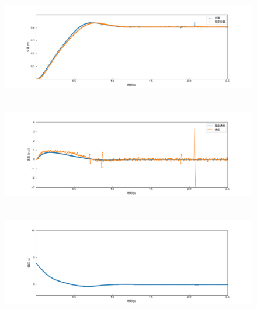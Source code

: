 \documentclass[12pt]{jsarticle}
\begin{document}
\begin{figure}[H]
  \begin{center}
    \includegraphics[clip,width=13.0cm, height=4.4cm]{../img/Exp11-1.png}
    \caption{}
    \label{Exp11-1}
  \end{center}
\end{figure}
\begin{figure}[H]
  \begin{center}
    \includegraphics[clip,width=13.0cm, height=4.4cm]{../img/Exp11-2.png}
    \caption{}
    \label{Exp11-2}
  \end{center}
\end{figure}
\begin{figure}[H]
  \begin{center}
    \includegraphics[clip,width=13.0cm, height=4.4cm]{../img/Exp11-3.png}
    \caption{}
    \label{Exp11-3}
  \end{center}
\end{figure}
\end{document}
